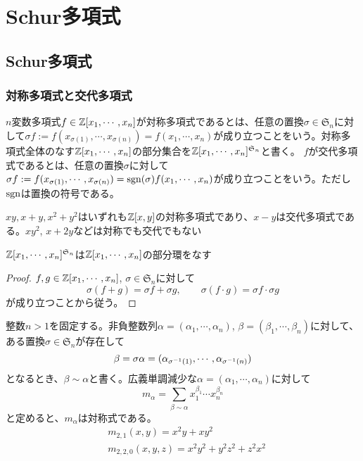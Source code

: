 \documentclass{ltjsreport}
\begin{document}
\chapter{Schur多項式}
\section{Schur多項式}
\subsection{対称多項式と交代多項式}
\begin{defin}
    $n$変数多項式$f\in\mathbb{Z}[x_1,\cdots,x_n]$が対称多項式であるとは、任意の置換$\sigma\in\mathfrak{S}_n$に対して$\sigma f:=f(x_{\sigma(1)},\cdots,x_{\sigma(n)})=f(x_1,\cdots,x_n)$が成り立つことをいう。対称多項式全体のなす$\mathbb{Z}[x_1,\cdots,x_n]$の部分集合を$\mathbb{Z}[x_1,\cdots,x_n]^{\mathfrak{S}_n}$と書く。
    $f$が交代多項式であるとは、任意の置換$\sigma$に対して$\sigma f:=f(x_{\sigma(1)},\cdots,x_{\sigma(n)})=\mathrm{sgn}(\sigma)f(x_1,\cdots,x_n)$が成り立つことをいう。ただし$\mathrm{sgn}$は置換の符号である。
\end{defin}

\begin{eg}
    $xy, x+y, x^2+y^2$はいずれも$\mathbb{Z}[x,y]$の対称多項式であり、$x-y$は交代多項式である。$xy^2$, $x+2y$などは対称でも交代でもない
\end{eg}

\begin{prop}
    $\mathbb{Z}[x_1,\cdots,x_n]^{\mathfrak{S}_n}$は$\mathbb{Z}[x_1,\cdots,x_n]$の部分環をなす
\end{prop}

\begin{proof}
    $f,g\in\mathbb{Z}[x_1,\cdots,x_n]$, $\sigma\in\mathfrak{S}_n$に対して
    \[
    \sigma(f+g)=\sigma f+\sigma g,\qquad \sigma(f\cdot g)=\sigma f\cdot \sigma g    
    \]
    が成り立つことから従う。
\end{proof}

\begin{eg}[単項対称式]
    整数$n>1$を固定する。非負整数列$\alpha=(\alpha_1,\cdots,\alpha_n)$, $\beta=(\beta_1,\cdots,\beta_n)$に対して、ある置換$\sigma\in\mathfrak{S}_n$が存在して
    \[
    \beta=\sigma\alpha=(\alpha_{\sigma^{-1}(1)},\cdots,\alpha_{\sigma^{-1}(n)})    
    \]
    となるとき、$\beta\sim\alpha$と書く。広義単調減少な$\alpha=(\alpha_1,\cdots,\alpha_n)$に対して
    \[
    m_\alpha=\sum_{\beta\sim\alpha}x_1^{\beta_1}\cdots x_n^{\beta_n}    
    \]
    と定めると、$m_\alpha$は対称式である。
    \begin{align*}
        &m_{2,1}(x,y)=x^2y+xy^2\\
        &m_{2,2,0}(x,y,z)=x^2y^2+y^2z^2+z^2x^2
    \end{align*}
\end{eg}
\end{document}
